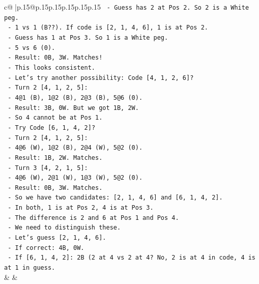 \documentclass{article}
\begin{document}
{\begin{supertabular}{c@{$\;$}|p{.15\linewidth}@{}p{.15\linewidth}p{.15\linewidth}p{.15\linewidth}p{.15\linewidth}p{.15\linewidth}}
{{{\texttt{          {-} Guess has 2 at Pos 2. So 2 is a White peg.} \\
\texttt{          {-} 1 vs 1 (B??). If code is {[}2, 1, 4, 6{]}, 1 is at Pos 2.} \\
\texttt{          {-} Guess has 1 at Pos 3. So 1 is a White peg.} \\
\texttt{          {-} 5 vs 6 (0).} \\
\texttt{          {-} Result: 0B, 3W. Matches!} \\
\texttt{      {-} This looks consistent.} \\
\texttt{    {-} Let's try another possibility: Code {[}4, 1, 2, 6{]}?} \\
\texttt{      {-} Turn 2 {[}4, 1, 2, 5{]}:} \\
\texttt{        {-} 4@1 (B), 1@2 (B), 2@3 (B), 5@6 (0).} \\
\texttt{        {-} Result: 3B, 0W. But we got 1B, 2W.} \\
\texttt{        {-} So 4 cannot be at Pos 1.} \\
\texttt{    {-} Try Code {[}6, 1, 4, 2{]}?} \\
\texttt{      {-} Turn 2 {[}4, 1, 2, 5{]}:} \\
\texttt{        {-} 4@6 (W), 1@2 (B), 2@4 (W), 5@2 (0).} \\
\texttt{        {-} Result: 1B, 2W. Matches.} \\
\texttt{      {-} Turn 3 {[}4, 2, 1, 5{]}:} \\
\texttt{        {-} 4@6 (W), 2@1 (W), 1@3 (W), 5@2 (0).} \\
\texttt{        {-} Result: 0B, 3W. Matches.} \\
\texttt{    {-} So we have two candidates: {[}2, 1, 4, 6{]} and {[}6, 1, 4, 2{]}.} \\
\texttt{    {-} In both, 1 is at Pos 2, 4 is at Pos 3.} \\
\texttt{    {-} The difference is 2 and 6 at Pos 1 and Pos 4.} \\
\texttt{    {-} We need to distinguish these.} \\
\texttt{    {-} Let's guess {[}2, 1, 4, 6{]}.} \\
\texttt{      {-} If correct: 4B, 0W.} \\
\texttt{      {-} If {[}6, 1, 4, 2{]}: 2B (2 at 4 vs 2 at 4? No, 2 is at 4 in code, 4 is at 1 in guess.} \\
            }
        }
    }
    & & \\ \\


\end{supertabular}}
\end{document}
